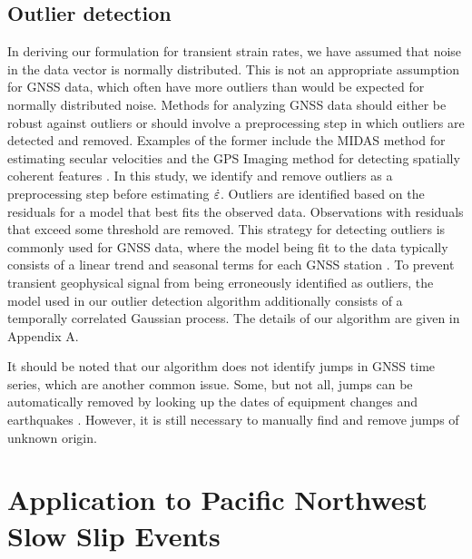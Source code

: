 \documentclass[extra,mreferee]{gji}
\begin{document}
\subsection{Outlier detection}\label{sec:Outlier}


In deriving our formulation for transient strain rates, we have
assumed that noise in the data vector is normally distributed. This is
not an appropriate assumption for GNSS data, which often have more
outliers than would be expected for normally distributed noise.
Methods for analyzing GNSS data should either be robust against
outliers or should involve a preprocessing step in which outliers are
detected and removed. Examples of the former include the MIDAS method
for estimating secular velocities \citep{Blewitt2016} and the GPS
Imaging method for detecting spatially coherent features
\citep{Hammond2016}. In this study, we identify and remove outliers as
a preprocessing step before estimating $\dot\varepsilon$. Outliers are
identified based on the residuals for a model that best fits the
observed data. Observations with residuals that exceed some threshold
are removed. This strategy for detecting outliers is commonly used for
GNSS data, where the model being fit to the data typically consists of
a linear trend and seasonal terms for each GNSS station
\citep[e.g.,][]{Johansson2002,Dong2006,Bos2013}. To prevent transient
geophysical signal from being erroneously identified as outliers, the
model used in our outlier detection algorithm additionally consists of
a temporally correlated Gaussian process. The details of our algorithm
are given in Appendix A.


It should be noted that our algorithm does not identify jumps in GNSS
time series, which are another common issue. Some, but not all, jumps
can be automatically removed by looking up the dates of equipment
changes and earthquakes \citep{Gazeaux2013}. However, it is still
necessary to manually find and remove jumps of unknown origin.


\section{Application to Pacific Northwest Slow Slip Events}\label{sec:Cascadia}
\end{document}

